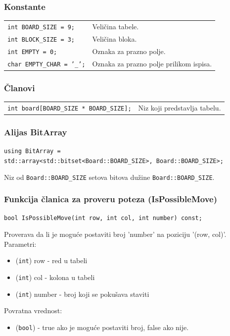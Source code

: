 \documentclass[a4paper]{article}
\begin{document}
    \subsubsection{Konstante}
    \begin{tabular}{ l l }
        \par\texttt{int BOARD\_SIZE = 9;} & Veličina tabele. \\
        \par\texttt{int BLOCK\_SIZE = 3;} & Veličina bloka. \\
        \par\texttt{int EMPTY = 0;}  & Oznaka za prazno polje. \\
        \par\texttt{char EMPTY\_CHAR = '\_';}  & Oznaka za prazno polje prilikom ispisa.
    \end{tabular}
    
    \subsubsection{Članovi}
    \begin{tabular}{ l l }
        \par\texttt{int board[BOARD\_SIZE * BOARD\_SIZE];} & Niz koji predstavlja tabelu.\\
    \end{tabular}

    \subsubsection{Alijas BitArray}
    {\parindent0pt
    \texttt{using BitArray = }\\
    \texttt{std::array<std::bitset<Board::BOARD\_SIZE>, Board::BOARD\_SIZE>;}
    }
    \par Niz od \texttt{Board::BOARD\_SIZE} setova bitova dužine \texttt{Board::BOARD\_SIZE}.
    
    \subsubsection{Funkcija članica za proveru poteza (IsPossibleMove)}
    \texttt{bool IsPossibleMove(int row, int col, int number) const;}
    \par Proverava da li je moguće postaviti broj 'number' na poziciju '(row, col)'.\\
    Parametri:
    \begin{itemize}
        \item (\texttt{int}) row - red u tabeli
        \item (\texttt{int}) col - kolona u tabeli
        \item (\texttt{int}) number - broj koji se pokušava staviti
    \end{itemize}
    Povratna vrednost:
    \begin{itemize}
        \item (\texttt{bool}) - true ako je moguće postaviti broj, false ako nije.
    \end{itemize}
\end{document}
